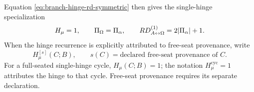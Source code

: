 Equation \eqref{eq:branch-hinge-rd-symmetric} then gives the single-hinge specialization
\begin{equation}
H_\mu=1,
\qquad
\Pi_\Omega=\Pi_\alpha,
\qquad
RD^{(1)}_{A{\leftrightarrow}\Omega}=2|\Pi_\alpha|+1.
\label{eq:single-hinge-symmetric-fixture}
\end{equation}
When the hinge recurrence is explicitly attributed to free-seat provenance, write
\begin{equation}
H_\mu^{[s]}(C;B),
\qquad
s(C)=\text{declared free-seat provenance of }C.
\label{eq:free-seat-hinge-provenance}
\end{equation}
For a full-seated single-hinge cycle, \(H_\mu(C;B)=1\); the
notation \(H_\mu^{\mathrm{cyc}}=1\) attributes the hinge to that cycle.
Free-seat provenance requires its separate declaration.
